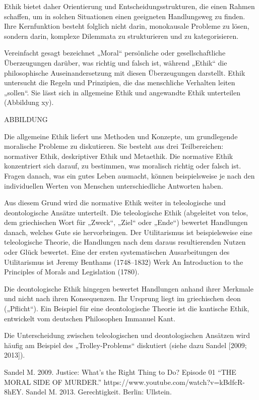 \documentclass[
  letterpaper,
  DIV=11,
  numbers=noendperiod]{scrartcl}
\begin{document}
Ethik bietet daher Orientierung und Entscheidungsstrukturen, die einen
Rahmen schaffen, um in solchen Situationen einen geeigneten Handlungsweg
zu finden. Ihre Kernfunktion besteht folglich nicht darin, monokausale
Probleme zu lösen, sondern darin, komplexe Dilemmata zu strukturieren
und zu kategorisieren.

Vereinfacht gesagt bezeichnet „Moral`` persönliche oder
gesellschaftliche Überzeugungen darüber, was richtig und falsch ist,
während „Ethik`` die philosophische Auseinandersetzung mit diesen
Überzeugungen darstellt. Ethik untersucht die Regeln und Prinzipien, die
das menschliche Verhalten leiten „sollen``. Sie lässt sich in allgemeine
Ethik und angewandte Ethik unterteilen (Abbildung xy).

ABBILDUNG

Die allgemeine Ethik liefert uns Methoden und Konzepte, um grundlegende
moralische Probleme zu diskutieren. Sie besteht aus drei Teilbereichen:
normativer Ethik, deskriptiver Ethik und Metaethik. Die normative Ethik
konzentriert sich darauf, zu bestimmen, was moralisch richtig oder
falsch ist. Fragen danach, was ein gutes Leben ausmacht, können
beispielsweise je nach den individuellen Werten von Menschen
unterschiedliche Antworten haben.

Aus diesem Grund wird die normative Ethik weiter in teleologische und
deontologische Ansätze unterteilt. Die teleologische Ethik (abgeleitet
von telos, dem griechischen Wort für „Zweck``, „Ziel`` oder „Ende``)
bewertet Handlungen danach, welches Gute sie hervorbringen. Der
Utilitarismus ist beispielsweise eine teleologische Theorie, die
Handlungen nach dem daraus resultierenden Nutzen oder Glück bewertet.
Eine der ersten systematischen Ausarbeitungen des Utilitarismus ist
Jeremy Benthams (1748--1832) Werk An Introduction to the Principles of
Morals and Legislation (1780).

Die deontologische Ethik hingegen bewertet Handlungen anhand ihrer
Merkmale und nicht nach ihren Konsequenzen. Ihr Ursprung liegt im
griechischen deon („Pflicht``). Ein Beispiel für eine deontologische
Theorie ist die kantische Ethik, entwickelt vom deutschen Philosophen
Immanuel Kant.

Die Unterscheidung zwischen teleologischen und deontologischen Ansätzen
wird häufig am Beispiel des „Trolley-Problems`` diskutiert (siehe dazu
Sandel {[}2009; 2013{]}).

\begin{tcolorbox}[enhanced jigsaw, opacitybacktitle=0.6, breakable, left=2mm, colback=white, leftrule=.75mm, colbacktitle=quarto-callout-note-color!10!white, bottomrule=.15mm, toprule=.15mm, titlerule=0mm, title=\textcolor{quarto-callout-note-color}{\faInfo}\hspace{0.5em}{Weiterführende Literatur}, colframe=quarto-callout-note-color-frame, bottomtitle=1mm, opacityback=0, arc=.35mm, toptitle=1mm, rightrule=.15mm, coltitle=black]

Sandel M. 2009. Justice: What's the Right Thing to Do? Episode 01 ``THE
MORAL SIDE OF MURDER.'' https://www.youtube.com/watch?v=kBdfcR-8hEY.
Sandel M. 2013. Gerechtigkeit. Berlin: Ullstein.

\end{tcolorbox}
\end{document}
